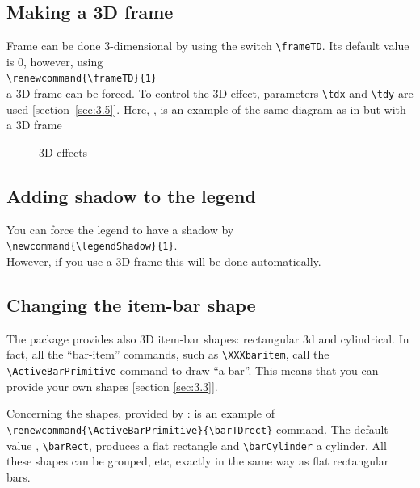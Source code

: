 \documentclass[12pt]{article}
\begin{document}
\subsection{Making a 3D frame \label{sec:2.4}}
Frame can be done 3-dimensional by using the switch
\verb+\frameTD+. Its default value is 0, however, using\\
\verb+\renewcommand{\frameTD}{1}+
\\
a 3D frame can be forced. To control the 3D effect, parameters
\verb+\tdx+ and \verb+\tdy+ are used [section~\ref{sec:3.5}].
Here, , is an example of the same diagram as in
 but with a 3D frame
%
\begin{figure}[!ht]
\renewcommand{\betweenticks}{50}
\subfigure[3D frame]{\label{fig:8a}
  \renewcommand{\frameTD}{1}
  \centering
  
}
\subfigure[3D items]{\label{fig:8b}
 \renewcommand{\frameTD}{0}
 \renewcommand{\ActiveBarPrimitive}{\barTDRect}
 
}
\caption{\label{fig:8} 3D effects}
\end{figure}

\subsection{Adding shadow to the legend \label{sec:2.5}}
You can force the legend to have a shadow by\\
\verb+\newcommand{\legendShadow}{1}+.\\
However, if you use a 3D frame this will be done automatically.

\subsection{Changing the item-bar shape \label{sec:2.6}}
The \bard package provides also 3D item-bar shapes: rectangular 3d and
cylindrical. In fact, all the ``bar-item'' commands, such as
\verb+\XXXbaritem+, call the
\verb+\ActiveBarPrimitive+ command to draw ``a bar''. This means that
you can provide your own shapes [section \ref{sec:3.3}]. 

Concerning the shapes, provided by \bard:  is an
example of\\ \verb+\renewcommand{\ActiveBarPrimitive}{\barTDrect}+
command.
The default value , \verb+\barRect+,
 produces a flat rectangle and 
\verb+\barCylinder+ a cylinder.
All these shapes can be grouped, etc, exactly in the same way as flat
rectangular bars.
\end{document}
